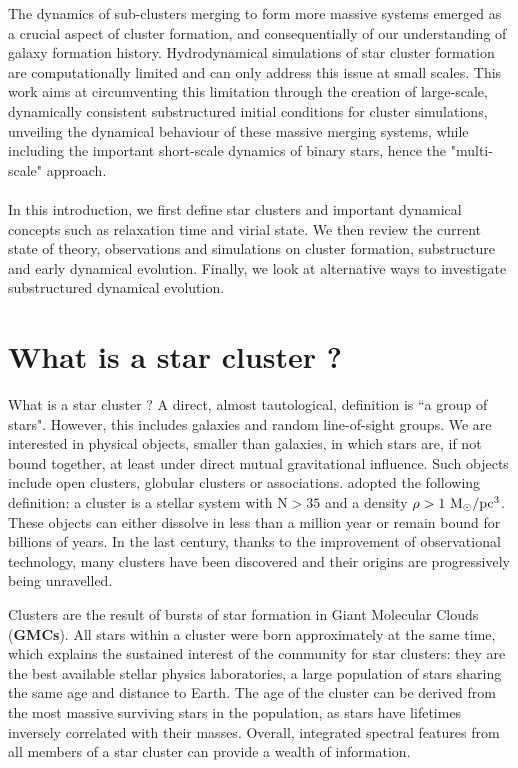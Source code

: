 The dynamics of sub-clusters merging to form more massive systems emerged as a crucial aspect of cluster formation, and consequentially of our understanding of galaxy formation history. Hydrodynamical simulations of star cluster formation are computationally limited and can only address this issue at small scales. This work aims at circumventing this limitation through the creation of large-scale, dynamically consistent substructured initial conditions for cluster simulations, unveiling the dynamical behaviour of these massive merging systems, while including the important short-scale dynamics of binary stars, hence the "multi-scale" approach.

\paragraph*{}
In this introduction, we first define star clusters and important dynamical concepts such as relaxation time and virial state. We then review the current state of theory, observations and simulations on cluster formation, substructure and early dynamical evolution. Finally, we look at alternative ways to investigate substructured dynamical evolution.




\newpage

\section{What is a star cluster ?}


 What is a star cluster ? A direct, almost tautological, definition is ``a group of stars". However, this includes galaxies and random line-of-sight groups. We are interested in physical objects, smaller than galaxies, in which stars are, if not bound together, at least under direct mutual gravitational influence. Such objects include open clusters, globular clusters or associations.  \cite{Lada2003} adopted the following definition: a cluster is a stellar system with N$>35$ and a density $\rho > 1~{\textrm{M}_\odot} /\textrm{pc}^3$. These objects can either dissolve in less than a million year or remain bound for billions of years. In the last century, thanks to the improvement of observational technology, many  clusters have been discovered and their origins are progressively being unravelled.

Clusters are the result of bursts of star formation in Giant Molecular Clouds (\textbf{GMCs}). All stars within a cluster were born approximately at the same time, which explains the sustained interest of the community for star clusters: they are the best available stellar physics laboratories, a large population of stars sharing the same age and distance to Earth. The age of the cluster can be derived from the most massive surviving stars in the population, as stars have lifetimes inversely correlated with their masses. Overall, integrated spectral features from all members of a star cluster can provide a wealth of information. 

